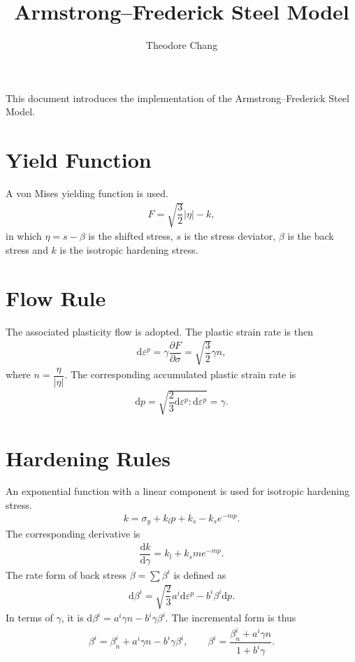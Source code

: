 \documentclass[a4paper,10pt,fleqn]{article}
\title{Armstrong--Frederick Steel Model}
\author{Theodore Chang}
\date{}\pagestyle{empty}
\newcommand*{\md}[1]{\mathrm{d}#1}
\newcommand*{\pfrac}[2]{\dfrac{\partial#1}{\partial#2}}
\newcommand*{\ddfrac}[2]{\dfrac{\md#1}{\md#2}}
\begin{document}
\noindent{}This document introduces the implementation of the Armstrong--Frederick Steel Model.
\section{Yield Function}
A von Mises yielding function is used.
\begin{gather}
F=\sqrt{\dfrac{3}{2}}\Big|\eta\Big|-k,
\end{gather}
in which $\eta=s-\beta$ is the shifted stress, $s$ is the stress deviator, $\beta$ is the back stress and $k$ is the isotropic hardening stress.
\section{Flow Rule}
The associated plasticity flow is adopted. The plastic strain rate is then
\begin{gather}
\md{\varepsilon^p}=\gamma\pfrac{F}{\sigma}=\sqrt{\dfrac{3}{2}}\gamma{}n,
\end{gather}
where $n=\dfrac{\eta}{\Big|\eta\Big|}$. The corresponding accumulated plastic strain rate is
\begin{gather}
\md{p}=\sqrt{\dfrac{2}{3}\md{\varepsilon^p}:\md{\varepsilon^p}}=\gamma.
\end{gather}
\section{Hardening Rules}
An exponential function with a linear component is used for isotropic hardening stress.
\begin{gather}
k=\sigma_y+k_lp+k_s-k_se^{-mp}.
\end{gather}
The corresponding derivative is
\begin{gather}
\ddfrac{k}{\gamma}=k_l+k_sme^{-mp}.
\end{gather}
The rate form of back stress $\displaystyle\beta=\sum\beta^i$ is defined as
\begin{gather*}
\md{\beta^i}=\sqrt{\dfrac{2}{3}}a^i\md{\varepsilon^p}-b^i\beta^i\md{p}.
\end{gather*}
In terms of $\gamma$, it is $\md{\beta^i}=a^i\gamma{}n-b^i\gamma\beta^i$. The incremental form is thus
\begin{gather}
\beta^i=\beta_n^i+a^i\gamma{}n-b^i\gamma\beta^i,\qquad
\beta^i=\dfrac{\beta_n^i+a^i\gamma{}n}{1+b^i\gamma}.
\end{gather}
\end{document}
